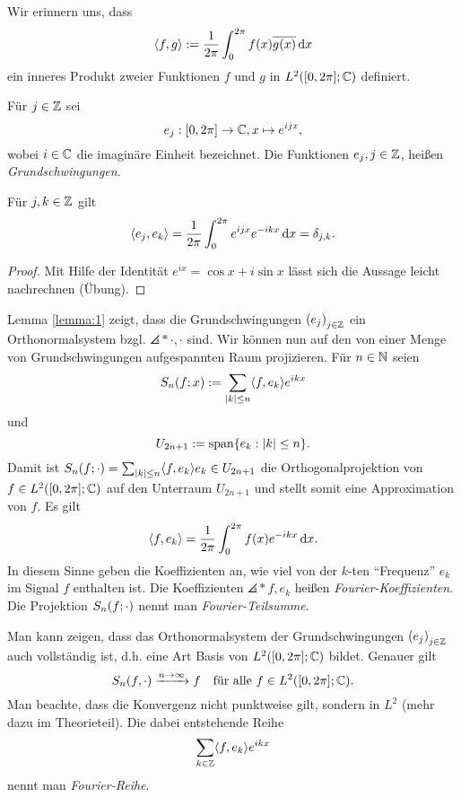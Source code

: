 \documentclass{lecture}
\begin{document}
    Wir erinnern uns, dass
    \[
        \angles*{f, g} := \frac{1}{2\pi}\int_0^{2\pi}f\parentheses*{x}\overline{g\parentheses*{x}}\d x
    \]
    ein inneres Produkt zweier Funktionen \(f\) und \(g\) in \(L^2\parentheses*{\brackets*{0, 2\pi}; \C}\) definiert.
    \begin{definition}
        Für \(j \in \Z\) sei
        \[
            e_j: \brackets*{0, 2\pi} \to \C, x \mapsto e^{ijx},
        \]
        wobei \(i \in \C\) die imaginäre Einheit bezeichnet.
        Die Funktionen \(e_j, j \in \Z\), heißen \emph{Grundschwingungen}.
    \end{definition}
    \begin{lemma}\label{lemma:1}
        Für \(j, k \in \Z\) gilt
        \[
            \angles*{e_j, e_k} = \frac{1}{2\pi}\int_0^{2\pi}e^{ijx}e^{-ikx}\d x = \delta_{j, k}.
        \]
    \end{lemma}
    \begin{proof}
        Mit Hilfe der Identität \(e^{ix} = \cos x + i \sin x\) lässt sich die Aussage leicht nachrechnen (Übung).
    \end{proof}
    \begin{remark}
        Lemma \ref{lemma:1} zeigt, dass die Grundschwingungen \(\parentheses*{e_j}_{j \in \Z}\) ein Orthonormalsystem bzgl. \(\angles*{\cdot, \cdot}\) sind.
        Wir können nun auf den von einer Menge von Grundschwingungen aufgespannten Raum projizieren.
        Für \(n \in \N\) seien
        \[
            S_n\parentheses*{f; x} := \sum_{\absolute*{k} \le n}\angles*{f, e_k}e^{ikx}
        \]
        und
        \[
            U_{2n + 1} := \setspan\braces*{e_k : \absolute*{k} \le n}.
        \]
        Damit ist \(S_n\parentheses*{f; \cdot} = \sum_{\absolute*{k} \le n}\angles*{f, e_k}e_k \in U_{2n + 1}\) die Orthogonalprojektion von \(f \in L^2\parentheses*{\brackets*{0, 2\pi}; \C}\) auf den Unterraum \(U_{2n + 1}\) und stellt somit eine Approximation von \(f\).
        Es gilt
        \[
            \angles*{f, e_k} = \frac{1}{2\pi}\int_0^{2\pi}f\parentheses*{x}e^{-ikx}\d x.
        \]
        In diesem Sinne geben die Koeffizienten an, wie viel von der \(k\)-ten ``Frequenz'' \(e_k\) im Signal \(f\) enthalten ist.
        Die Koeffizienten \(\angles*{f, e_k}\) heißen \emph{Fourier-Koeffizienten}.
        Die Projektion \(S_n\parentheses*{f; \cdot}\) nennt man \emph{Fourier-Teilsumme}.
    \end{remark}
    \begin{remark}
        Man kann zeigen, dass das Orthonormalsystem der Grundschwingungen \(\parentheses*{e_j}_{j \in \Z}\) auch vollständig ist, d.h. eine Art Basis von \(L^2\parentheses*{\brackets*{0, 2\pi}; \C}\) bildet.
        Genauer gilt
        \[
            S_n\parentheses*{f, \cdot} \xrightarrow{n \to \infty} f \quad \text{für alle }f \in L^2\parentheses*{\brackets*{0, 2\pi}; \C}.
        \]
        Man beachte, dass die Konvergenz nicht punktweise gilt, sondern in \(L^2\) (mehr dazu im Theorieteil).
        Die dabei entstehende Reihe
        \[
            \sum_{k \in \Z}\angles*{f, e_k}e^{ikx}
        \]
        nennt man \emph{Fourier-Reihe}.
    \end{remark}
\end{document}
